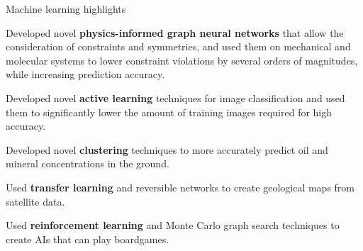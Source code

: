 


\begin{cventries}


  \cventry
    {Machine learning highlights} %
    {} %
    {} %
    {} %
    {
      \begin{cvitems} %
        \item {Developed novel \textbf{physics-informed graph neural networks} that allow the consideration of constraints and symmetries, and used them on mechanical and molecular systems to lower constraint violations by several orders of magnitudes, while increasing prediction accuracy.}
        \item {Developed novel \textbf{active learning} techniques for image classification and used them to significantly lower the amount of training images required for high accuracy.}
        \item {Developed novel \textbf{clustering} techniques to more accurately predict oil and mineral concentrations in the ground.}
        \item {Used \textbf{transfer learning} and reversible networks to create geological maps from satellite data.}
        \item {Used \textbf{reinforcement learning} and Monte Carlo graph search techniques to create AIs that can play boardgames.}
      \end{cvitems}
    }


\end{cventries}
